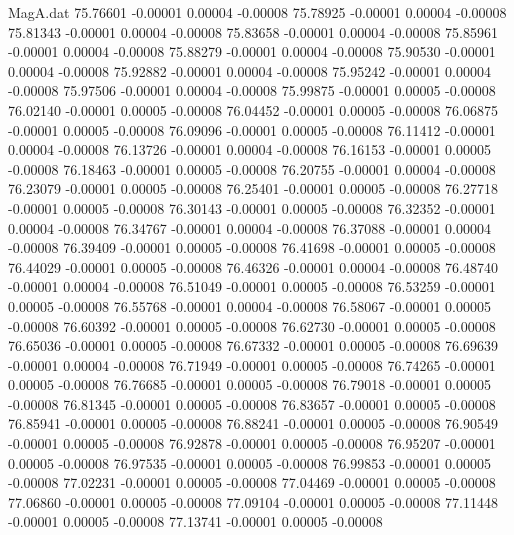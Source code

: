\begin{filecontents}{MagA.dat}
  75.76601   -0.00001    0.00004   -0.00008
  75.78925   -0.00001    0.00004   -0.00008
  75.81343   -0.00001    0.00004   -0.00008
  75.83658   -0.00001    0.00004   -0.00008
  75.85961   -0.00001    0.00004   -0.00008
  75.88279   -0.00001    0.00004   -0.00008
  75.90530   -0.00001    0.00004   -0.00008
  75.92882   -0.00001    0.00004   -0.00008
  75.95242   -0.00001    0.00004   -0.00008
  75.97506   -0.00001    0.00004   -0.00008
  75.99875   -0.00001    0.00005   -0.00008
  76.02140   -0.00001    0.00005   -0.00008
  76.04452   -0.00001    0.00005   -0.00008
  76.06875   -0.00001    0.00005   -0.00008
  76.09096   -0.00001    0.00005   -0.00008
  76.11412   -0.00001    0.00004   -0.00008
  76.13726   -0.00001    0.00004   -0.00008
  76.16153   -0.00001    0.00005   -0.00008
  76.18463   -0.00001    0.00005   -0.00008
  76.20755   -0.00001    0.00004   -0.00008
  76.23079   -0.00001    0.00005   -0.00008
  76.25401   -0.00001    0.00005   -0.00008
  76.27718   -0.00001    0.00005   -0.00008
  76.30143   -0.00001    0.00005   -0.00008
  76.32352   -0.00001    0.00004   -0.00008
  76.34767   -0.00001    0.00004   -0.00008
  76.37088   -0.00001    0.00004   -0.00008
  76.39409   -0.00001    0.00005   -0.00008
  76.41698   -0.00001    0.00005   -0.00008
  76.44029   -0.00001    0.00005   -0.00008
  76.46326   -0.00001    0.00004   -0.00008
  76.48740   -0.00001    0.00004   -0.00008
  76.51049   -0.00001    0.00005   -0.00008
  76.53259   -0.00001    0.00005   -0.00008
  76.55768   -0.00001    0.00004   -0.00008
  76.58067   -0.00001    0.00005   -0.00008
  76.60392   -0.00001    0.00005   -0.00008
  76.62730   -0.00001    0.00005   -0.00008
  76.65036   -0.00001    0.00005   -0.00008
  76.67332   -0.00001    0.00005   -0.00008
  76.69639   -0.00001    0.00004   -0.00008
  76.71949   -0.00001    0.00005   -0.00008
  76.74265   -0.00001    0.00005   -0.00008
  76.76685   -0.00001    0.00005   -0.00008
  76.79018   -0.00001    0.00005   -0.00008
  76.81345   -0.00001    0.00005   -0.00008
  76.83657   -0.00001    0.00005   -0.00008
  76.85941   -0.00001    0.00005   -0.00008
  76.88241   -0.00001    0.00005   -0.00008
  76.90549   -0.00001    0.00005   -0.00008
  76.92878   -0.00001    0.00005   -0.00008
  76.95207   -0.00001    0.00005   -0.00008
  76.97535   -0.00001    0.00005   -0.00008
  76.99853   -0.00001    0.00005   -0.00008
  77.02231   -0.00001    0.00005   -0.00008
  77.04469   -0.00001    0.00005   -0.00008
  77.06860   -0.00001    0.00005   -0.00008
  77.09104   -0.00001    0.00005   -0.00008
  77.11448   -0.00001    0.00005   -0.00008
  77.13741   -0.00001    0.00005   -0.00008

\end{filecontents}
